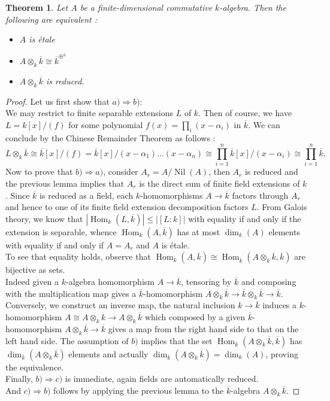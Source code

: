 \documentclass{article}
\theoremstyle{plain}
\newtheorem{theorem}{Theorem}[subsection]
\theoremstyle{definition}
\DeclareMathOperator{\Hom}{Hom}
\DeclareMathOperator{\Nil}{Nil}
\begin{document}
\begin{theorem}
\label{etale_algebras}
    Let $A$ be a finite-dimensional commutative $k$-algebra. Then the following are equivalent :
    \begin{itemize}
        \item[$a)$] $A$ is \'etale
        \item[$b)$] $A\otimes_k \overline{k} \cong \overline{k}^{\oplus^n}$
        \item[$c)$] $A\otimes_k\overline{k}$ is reduced.
    \end{itemize}
\end{theorem}
\begin{proof}
    Let us first show that $a)\Rightarrow b)$:\\
    We may restrict to finite separable extensions $L$ of $k$.
    Then of course, we have $L = k[x]/(f)$ for some polynomial $f(x)=\prod_i(x-\alpha_i)$ in $\overline{k}$.
    We can conclude by the Chinese Remainder Theorem as follows :
    $$L\otimes_k\overline{k} \cong \overline{k}[x]/(f) = \overline{k}[x]/(x-\alpha_1)...(x-\alpha_n)\cong \prod_{i=1}^n\overline{k}[x]/(x-\alpha_i) \cong \prod_{i=1}^n\overline{k}.$$
    Now to prove that $b)\Rightarrow a)$, consider $A_r = A/\Nil(A)$, then $A_r$ is reduced and the previous lemma implies that $A_r$ is the direct sum of finite field extensions of $k$.
    Since $\overline{k}$ is reduced as a field, each $k$-homomorphisms $A\rightarrow \overline{k}$ factors through $A_r$ and hence to one of its finite field extension decomposition factors $L$.
    From Galois theory, we know that $|\Hom_k(L,\overline{k})|\leq |[L:k]|$ with equality if and only if the extension is separable, 
    whence $\Hom_k(A,\overline{k})$ has at most $\dim_k(A)$ elements with equality if and only if $A = A_r$ and $A$ is \'etale. \\
    To see that equality holds, observe that $\Hom_k(A,\overline{k}) \cong \Hom_{\overline{k}}(A\otimes_k\overline{k},\overline{k})$ are bijective as sets.\\
    Indeed given a $k$-algebra homomorphism $A\rightarrow\overline{k}$, tensoring by $\overline{k}$ and composing with the multiplication map gives a $\overline{k}$-homomorphism $A\otimes_k\overline{k}\rightarrow \overline{k}\otimes_k\overline{k}\rightarrow \overline{k}$.
    Conversely, we construct an inverse map, the natural inclusion $k\rightarrow \overline{k}$ induces a $k$-homomorphism $A\cong A\otimes_kk\rightarrow A\otimes_k\overline{k}$ which composed by a given $\overline{k}$-homomorphism $A\otimes_k\overline{k}\rightarrow\overline{k}$ gives a map from the right hand side to that on the left hand side.
    The assumption of $b)$ implies that the set $\Hom_{\overline{k}}(A\otimes_k\overline{k}, \overline{k})$ has $\dim_{\overline{k}}(A\otimes_k\overline{k})$ elements and actually $\dim_{\overline{k}}(A\otimes_k\overline{k}) = \dim_k(A)$, proving the equivalence.\\
    Finally, $b)\Rightarrow c)$ is immediate, again fields are automatically reduced.\\
    And $c) \Rightarrow b)$ follows by applying the previous lemma to the $\overline{k}$-algebra $A\otimes_k\overline{k}$.
\end{proof}
\end{document}
